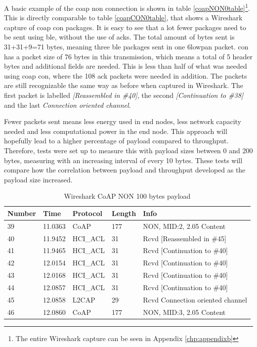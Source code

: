 \noindent A basic example of the \gls{coap} \gls{non} connection is shown in table \ref{coapNON0table}\footnote{The entire Wireshark capture can be seen in Appendix \ref{chp:appendixb}}. This is directly comparable to table \ref{coapCON0table}, that shows a Wireshark capture of \gls{coap} \gls{con} packages. It is easy to see that a lot fewer packages need to be sent using \gls{ble}, without the use of \glspl{ack}. The total amount of bytes sent is 31+31+9=71 bytes, meaning three \gls{ble} packages sent in one \gls{6lowpan} packet. \gls{con} has a packet size of 76 bytes in this transmission, which means a total of 5 header bytes and additional fields are needed. This is less than half of what was needed using \gls{coap} \gls{con}, where the 108 \gls{ack} packets were needed in addition. The packets are still recognizable the same way as before when captured in Wireshark. The first packet is labelled \textit{[Reassembled in \#40]}, the second \textit{[Continuation to \#38]} and the last \textit{Connection oriented channel}.

\noindent Fewer packets sent means less energy used in end nodes, less network capacity needed and less computational power in the end node. This approach will hopefully lead to a higher percentage of \gls{payload} compared to throughput. Therefore, tests were set up to measure this with \gls{payload} sizes between 0 and 200 bytes, measuring with an increasing interval of every 10 bytes. These tests will compare how the correlation between \gls{payload} and \gls{throughput} developed as the \gls{payload} size increased.

\begin{table}[H]
\small
\centering
\caption{Wireshark CoAP NON 100 bytes payload}
\label{coapNON100table}
\begin{tabular}{lllll}
\hline
Number & Time    & Protocol & Length & Info   							  \\ \hline                          
39     & 11.0363 & CoAP     & 177    & NON, MID:2, 2.05 Content         \\
40     & 11.9452 & HCI\_ACL & 31     & Rcvd {[}Reassembled in \#45{]}   \\
41     & 11.9465 & HCI\_ACL & 31     & Rcvd {[}Continuation to \#40{]}  \\
42     & 12.0154 & HCI\_ACL & 31     & Rcvd {[}Continuation to \#40{]}  \\
43     & 12.0168 & HCI\_ACL & 31     & Rcvd {[}Continuation to \#40{]}  \\
44     & 12.0857 & HCI\_ACL & 31     & Rcvd {[}Continuation to \#40{]}  \\
45     & 12.0858 & L2CAP    & 29     & Rcvd Connection oriented channel \\
46     & 12.0860 & CoAP     & 177    & NON, MID:3, 2.05 Content         \\ \hline
\end{tabular}
\end{table}


